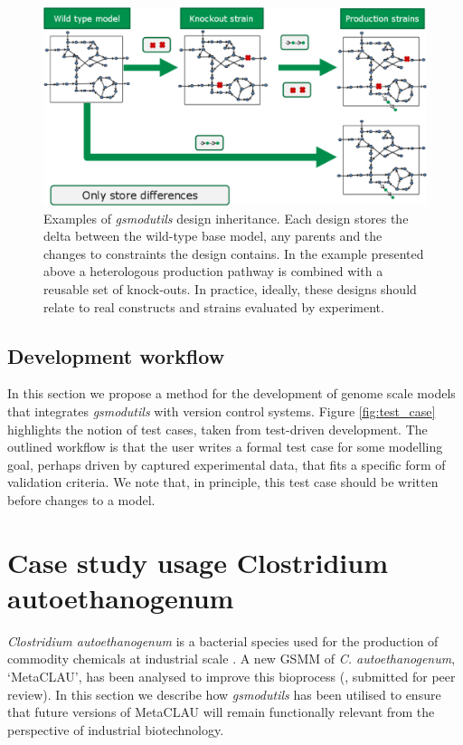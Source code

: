 \documentclass[journal=asbcd6]{achemso}
\begin{document}
\begin{figure}
  \includegraphics[width=\textwidth]{inheritence2.eps}
  \caption{Examples of \textit{gsmodutils} design inheritance.
  Each design stores the delta between the wild-type base model, any parents and the changes to constraints the design contains.
  In the example presented above a heterologous production pathway is combined with a reusable set of knock-outs.
  In practice, ideally, these designs should relate to real constructs and strains evaluated by experiment.
  }
    \label{fig:strain_hered}
\end{figure}

\subsection{Development workflow}
In this section we propose a method for the development of genome scale models that integrates \textit{gsmodutils} with version control systems.
Figure \ref{fig:test_case} highlights the notion of test cases, taken from test-driven development.
The outlined workflow is that the user writes a formal test case for some modelling goal, perhaps driven by captured experimental data, that fits a specific form of validation criteria.
We note that, in principle, this test case should be written before changes to a model.


\section{Case study usage Clostridium autoethanogenum}
\textit{Clostridium autoethanogenum} is a bacterial species used for the production of commodity chemicals at industrial scale \cite{abrini1994clostridium,norman2018progress,LT}. A new GSMM of \textit{C. autoethanogenum}, `MetaCLAU', has been analysed to improve this bioprocess (\cite{norman2018progress}, submitted for peer review).
In this section we describe how \textit{gsmodutils} has been utilised to ensure that future versions of MetaCLAU will remain functionally relevant from the perspective of industrial biotechnology.
\end{document}
